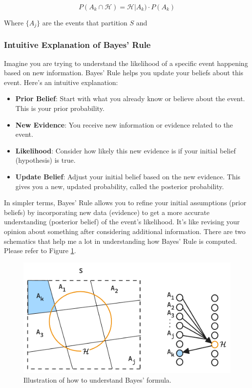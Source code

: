 \documentclass[a4paper,10pt]{article}
\newcommand{\hlt}[1]{\colorbox{color3}{#1}}
\newcommand{\hlti}[1]{\colorbox{color1}{#1}}
\begin{document}
\begin{equation}
P(A_k \cap \mathcal{H}) = \mathcal{H} | A_k) \cdot P(A_k)
\end{equation}

\noindent Where $\{A_j\}$ are the events that partition $ S $ and

\subsubsection{Intuitive Explanation of Bayes' Rule}

Imagine you are trying to understand the likelihood of a specific event happening based on new information. Bayes' Rule helps you update your beliefs about this event. Here's an intuitive explanation:

\begin{itemize}
    \item \textbf{Prior Belief}: Start with what you already know or believe about the event. This is your \hlt{prior} probability.
    \item \textbf{New Evidence}: You receive \hlt{new information} or evidence related to the event.
    \item \textbf{Likelihood}: Consider how likely this new evidence is if your initial belief (hypothesis) is true.
    \item \textbf{Update Belief}: Adjust your initial belief based on the new evidence. This gives you a new, updated probability, called the \hlt{posterior} probability.
\end{itemize}

In simpler terms, Bayes' Rule allows you to refine your initial assumptions (prior beliefs) by incorporating new data (evidence) to get a more accurate understanding (posterior belief) of the event's likelihood. It's like revising your opinion about something after considering \hlti{additional information}. There are two schematics that help me a lot in understanding how Bayes' Rule is computed. Please refer to Figure \ref{fig:bayes_schematic}. 

\begin{figure}[ht]
\centering
\includegraphics[width=0.4\linewidth]{Figures/bayes_schematic.png}
\caption{Illustration of how to understand Bayes' formula.}
\label{fig:bayes_schematic}
\end{figure}
\end{document}
